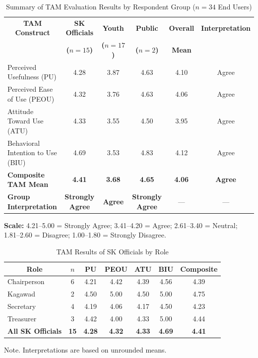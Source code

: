 \begin{table}[H]
\centering
\footnotesize
\setlength{\tabcolsep}{4pt}
\caption{Summary of TAM Evaluation Results by Respondent Group ($n = 34$ End Users)}
\label{tab:summary_tam_evaluation_results_by_respondent_group}
\begin{tabular}{|p{3.2cm}|c|c|c|c|c|}
\hline
\multicolumn{1}{|c|}{\textbf{TAM Construct}} & \textbf{SK Officials} & \textbf{Youth} & \textbf{Public} & \textbf{Overall} & \textbf{Interpretation} \\
 & \textbf{($n = 15$)} & \textbf{($n = 17$)} & \textbf{($n = 2$)} & \textbf{Mean} & \\ \hline
Perceived Usefulness (PU) & 4.28 & 3.87 & 4.63 & 4.10 & Agree \\ \hline
Perceived Ease of Use (PEOU) & 4.32 & 3.76 & 4.63 & 4.06 & Agree \\ \hline
Attitude Toward Use (ATU) & 4.33 & 3.55 & 4.50 & 3.95 & Agree \\ \hline
Behavioral Intention to Use (BIU) & 4.69 & 3.53 & 4.83 & 4.12 & Agree \\ \hline
\textbf{Composite TAM Mean} & \textbf{4.41} & \textbf{3.68} & \textbf{4.65} & \textbf{4.06} & \textbf{Agree} \\ \hline
\textbf{Group Interpretation} & \textbf{Strongly Agree} & \textbf{Agree} & \textbf{Strongly Agree} & --- & --- \\ \hline
\end{tabular}
\end{table}
\vspace{3mm}

\noindent\textbf{Scale:} 4.21--5.00 = Strongly Agree; 3.41--4.20 = Agree; 2.61--3.40 = Neutral; 1.81--2.60 = Disagree; 1.00--1.80 = Strongly Disagree.
\vspace{5mm}

\begin{table}[H]
\centering
\small
\caption{TAM Results of SK Officials by Role}
\label{tab:tam_results_of_sk_officials_by_role}
\begin{tabular}{|l|c|c|c|c|c|c|}
\hline
\multicolumn{1}{|c|}{\textbf{Role}} & \textbf{$n$} & \textbf{PU} & \textbf{PEOU} & \textbf{ATU} & \textbf{BIU} & \textbf{Composite} \\ \hline
Chairperson & 6 & 4.21 & 4.42 & 4.39 & 4.56 & 4.39 \\ \hline
Kagawad & 2 & 4.50 & 5.00 & 4.50 & 5.00 & 4.75 \\ \hline
Secretary & 4 & 4.19 & 4.06 & 4.17 & 4.50 & 4.23 \\ \hline
Treasurer & 3 & 4.42 & 4.00 & 4.33 & 5.00 & 4.44 \\ \hline
\textbf{All SK Officials} & \textbf{15} & \textbf{4.28} & \textbf{4.32} & \textbf{4.33} & \textbf{4.69} & \textbf{4.41} \\ \hline
\end{tabular}

\vspace{2mm}
\par\noindent Note. Interpretations are based on unrounded means.
\end{table}
\vspace{3mm}


